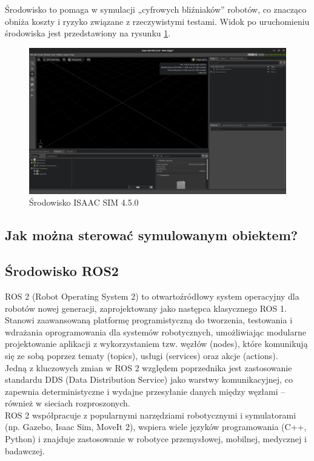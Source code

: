 \documentclass[12pt]{article}
\begin{document}
\noindent Środowisko to pomaga w symulacji „cyfrowych bliźniaków” robotów, co znacząco obniża koszty i ryzyko związane z rzeczywistymi testami. Widok po uruchomieniu środowiska jest przedstawiony na rysunku \ref{srodowiskoISAACSIM}.

\begin{figure}[h]
    \centering
    \includegraphics[width=0.75\linewidth]{Zdjęcia/widokISAACSIM.png}
    \caption{Środowisko ISAAC SIM 4.5.0}
    \label{srodowiskoISAACSIM}
\end{figure}

\clearpage

\subsection{Jak można sterować symulowanym obiektem?}

\subsection{Środowisko ROS2}

\noindent ROS 2 (Robot Operating System 2) to otwartoźródłowy system operacyjny dla robotów nowej generacji, zaprojektowany jako następca klasycznego ROS 1. Stanowi zaawansowaną platformę programistyczną do tworzenia, testowania i wdrażania oprogramowania dla systemów robotycznych, umożliwiając modularne projektowanie aplikacji z wykorzystaniem tzw. węzłów (nodes), które komunikują się ze sobą poprzez tematy (topics), usługi (services) oraz akcje (actions).\\


\noindent Jedną z kluczowych zmian w ROS 2 względem poprzednika jest zastosowanie standardu DDS (Data Distribution Service) jako warstwy komunikacyjnej, co zapewnia deterministyczne i wydajne przesyłanie danych między węzłami – również w sieciach rozproszonych.\\

\noindent ROS 2 współpracuje z popularnymi narzędziami robotycznymi i symulatorami (np. Gazebo, Isaac Sim, MoveIt 2), wspiera wiele języków programowania (C++, Python) i znajduje zastosowanie w robotyce przemysłowej, mobilnej, medycznej i badawczej.
\end{document}
